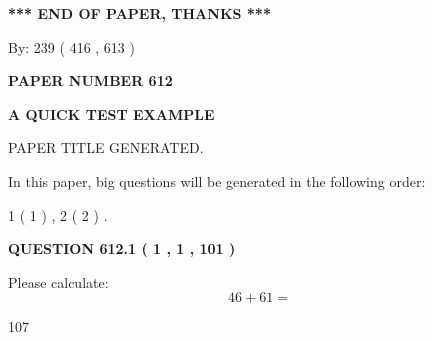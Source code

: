 \documentclass[12pt]{article}
\begin{document}
   
   
   
\vspace{1.0in} 
{\textbf{\large{ *** END OF PAPER, THANKS *** }}} 
   
   
\hspace{1.0in} By: 
 239 ( 416 ,  613 )
   
   
   
   
\newpage 
\setcounter{page}{ 
   612001 } 
   
   
   
   
 {\textbf{ \Large{ PAPER NUMBER  612  }}}
   
   
\vspace{0.2in}
   
   
   
   
   
   
   
   
 \vspace{0.2in}
{\LARGE {\textbf{ A QUICK TEST EXAMPLE}}}
   
   
 PAPER TITLE GENERATED.
   
   
   
\vspace{0.2in}
   
In this paper, big questions will be generated in the following order: 
   
   
   1 ( 1 )
 ,
   2 ( 2 )
 .
  
\vspace{0.2in}
  
{\textbf{\Large{QUESTION
612.1 
 ( 1 , 1 , 101 )
}}}
  
  
 
Please calculate:
\begin{equation}
46 +  %
61 = \nonumber
\end{equation}
 
 
 
\noindent{}
 
 

107
 
 
\noindent{}
 
 

 
 
 
\noindent{}
 
\end{document}
